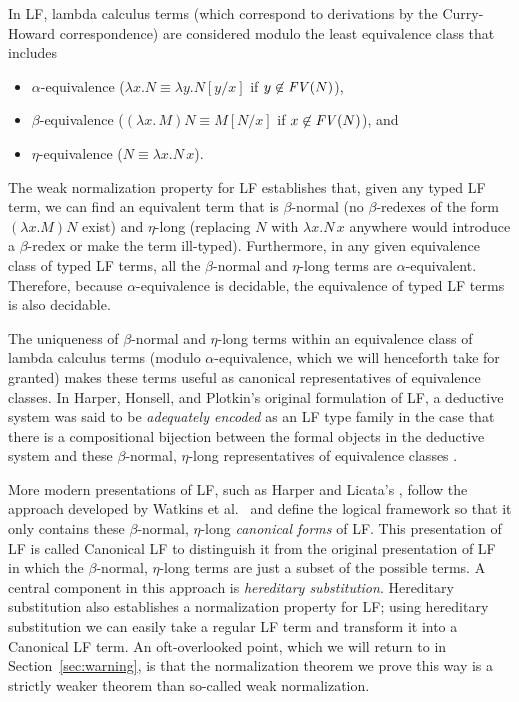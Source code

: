 In LF, lambda calculus terms (which correspond to derivations by the
Curry-Howard correspondence) are considered modulo the least
equivalence class that includes
\begin{itemize}
\item $\alpha$-equivalence ($\lambda x.N \equiv \lambda y.N[y/x]$ if 
$y \not\in {\it FV}(N)$), 
\item $\beta$-equivalence 
($(\lambda x.\,M)N \equiv M[N/x]$ if $x \not\in {\it FV}(N)$), and 
\item $\eta$-equivalence ($N \equiv \lambda x.N\,x$).
\end{itemize}
The weak normalization property for LF establishes that, given any
typed LF term, we can find an equivalent term that is $\beta$-normal
(no $\beta$-redexes of the form $(\lambda x.M) N$ exist) and
$\eta$-long (replacing $N$ with $\lambda x.N\,x$ anywhere would
introduce a $\beta$-redex or make the term ill-typed).  Furthermore,
in any given equivalence class of typed LF terms, all the
$\beta$-normal and $\eta$-long terms are $\alpha$-equivalent.
Therefore, because $\alpha$-equivalence is decidable, the equivalence
of typed LF terms is also decidable. 

The uniqueness of $\beta$-normal and $\eta$-long terms within an
equivalence class of lambda calculus terms (modulo
$\alpha$-equivalence, which we will henceforth take for granted) makes
these terms useful as canonical representatives of equivalence
classes. In Harper, Honsell, and Plotkin's original formulation
of LF, a deductive system was said to be {\it adequately encoded} as
an LF type family in the case that there is a compositional bijection
between the formal objects in the deductive system and these
$\beta$-normal, $\eta$-long representatives of equivalence classes
\cite{harper93framework}.

More modern presentations of LF, such as Harper and Licata's
\cite{harper07mechanizing}, follow the approach developed by Watkins
et al.~\cite{watkins02concurrent} and define the logical framework so
that it only contains these $\beta$-normal, $\eta$-long {\it canonical
  forms} of LF. This presentation of LF is called Canonical LF to
distinguish it from the original presentation of LF in which the
$\beta$-normal, $\eta$-long terms are just a subset of the possible
terms. A central component in this approach is {\it hereditary
  substitution}.  Hereditary substitution also establishes a
normalization property for LF; using hereditary substitution we can
easily take a regular LF term and transform it into a Canonical LF
term.%
An oft-overlooked point,
which we will return to in Section~\ref{sec:warning}, is that the
normalization theorem we prove this way is a strictly weaker theorem
than so-called weak normalization.

